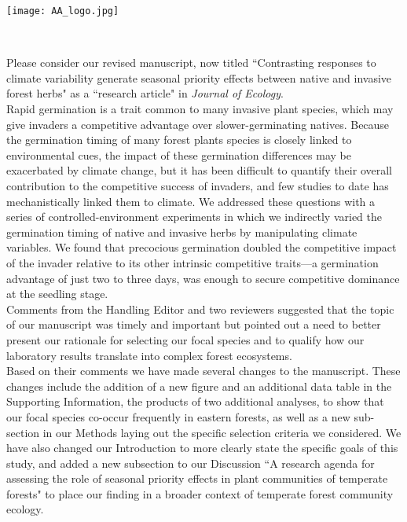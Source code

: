 \documentclass[11 pt]{article}
\begin{document}

\def\labelitemi{--}
\parindent=24pt
\noindent\texttt{[image: AA\_logo.jpg]}

\\
\vspace{1.5ex}

\noindent Please consider our revised manuscript, now titled ``Contrasting responses to climate variability generate seasonal priority effects between native and invasive forest herbs" as a ``research article" in \textit{Journal of Ecology}.\\

\noindent Rapid germination is  a trait common to many invasive plant species, which may give invaders a competitive advantage over slower-germinating natives. Because the germination timing of many forest plants species is closely linked to environmental cues, the impact of these germination differences may be exacerbated by climate change, but it has been difficult to quantify their overall contribution to the competitive success of invaders, and few studies to date has mechanistically linked them to climate. We addressed these questions with a series of controlled-environment experiments in which we indirectly varied the germination timing of native and invasive herbs by manipulating climate variables. We found that precocious germination doubled the competitive impact of the invader relative to its other intrinsic competitive traits---a germination advantage of just two to three days, was enough to secure competitive dominance at the seedling stage.\\

\noindent Comments from the Handling Editor and two reviewers suggested that the topic of our manuscript was timely and important but pointed out a need to better present our rationale for selecting our focal species and to qualify how our laboratory results translate into complex forest ecosystems.\\

\noindent Based on their comments we have made several changes to the manuscript. These changes include the addition of a new figure and an additional data table in the Supporting Information, the products of two additional analyses, to show that our focal species co-occur frequently in eastern forests, as well as a new sub-section in our Methods laying out the specific selection criteria we considered. We have also changed our Introduction to more clearly state the specific goals of this study, and added a new subsection to our Discussion ``A research agenda for assessing the role of seasonal priority effects in plant communities of temperate forests" to place our finding in a broader context of temperate forest community ecology. \\ 
\end{document}
